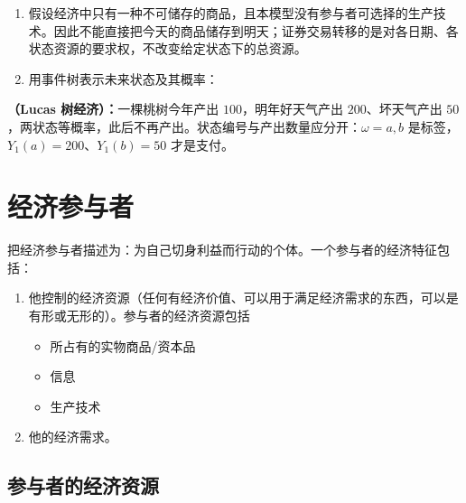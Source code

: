 \begin{enumerate}
\item 假设经济中只有一种不可储存的商品，且本模型没有参与者可选择的生产技术。因此不能直接把今天的商品储存到明天；证券交易转移的是对各日期、各状态资源的要求权，不改变给定状态下的总资源。
\item 用事件树表示未来状态及其概率：
\begin{center}
\end{center}
\end{enumerate}

\begin{tcolorbox}[example]
\textbf{（Lucas 树经济）：}一棵桃树今年产出 $100$，明年好天气产出 $200$、坏天气产出 $50$，两状态等概率，此后不再产出。状态编号与产出数量应分开：$\omega=a,b$ 是标签，$Y_1(a)=200$、$Y_1(b)=50$ 才是支付。
\begin{center}
\end{center}
\end{tcolorbox}

\section{经济参与者}

    把经济参与者描述为：为自己切身利益而行动的个体。一个参与者的经济特征包括：
    \begin{enumerate}
        \item 他控制的经济资源（任何有经济价值、可以用于满足经济需求的东西，可以是有形或无形的）。参与者的经济资源包括
        \begin{itemize}
            \item 所占有的实物商品/资本品
            \item 信息
            \item 生产技术
        \end{itemize}
        \item 他的经济需求。
    \end{enumerate}

\subsection{参与者的经济资源}
